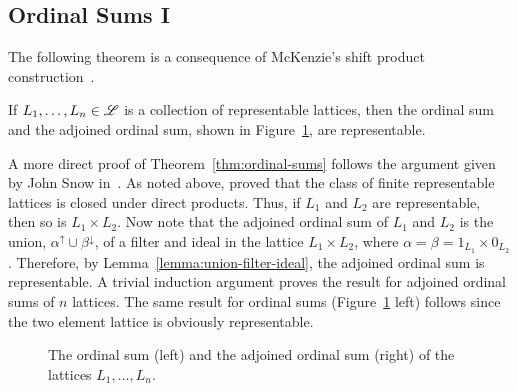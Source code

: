 \subsection{Ordinal Sums I}
\label{sec:ordinal-sums}

The following theorem is a consequence of 
McKenzie's shift product construction~\cite{McKenzie:1984}. %
\begin{theorem}
  \label{thm:ordinal-sums}
  If $L_1, \dots, L_n \in \mathscr{L}$ is a collection of representable lattices, then
  the ordinal sum and the adjoined ordinal sum, shown in
  Figure~\ref{fig:ord_adjord}, are representable.
\end{theorem}
A more direct proof of Theorem~\ref{thm:ordinal-sums} follows the argument given
by John Snow in~\cite{Snow:2000}.  As noted above, 
\Jiri \Tuma proved that
the class of finite representable lattices is closed under direct products.
Thus, if $L_1$ and 
$L_2$ are representable, then so is $L_1 \times L_2$.  Now note that the
adjoined ordinal sum of $L_1$ and $L_2$ is the union, $\alpha^\uparrow \cup
\beta^\downarrow$,  of a filter and ideal  
in the lattice $L_1 \times L_2$, where
$\alpha = \beta = 1_{L_1} \times 0_{L_2}$.  
Therefore, by Lemma~\ref{lemma:union-filter-ideal},
the adjoined ordinal sum is representable.  A trivial induction argument proves the
result for adjoined ordinal sums of $n$ lattices.  The same result for ordinal
sums (Figure~\ref{fig:ord_adjord} left) follows since the two element lattice is
obviously representable. 

\begin{center}
  \begin{figure}[h!]
    \label{fig:ord_adjord}
    \centering
        {
          \hskip1cm
        }
        \caption{The ordinal sum (left) and the adjoined ordinal sum (right) of
          the lattices $L_1, \dots, L_n$.}
  \end{figure}
\end{center}

